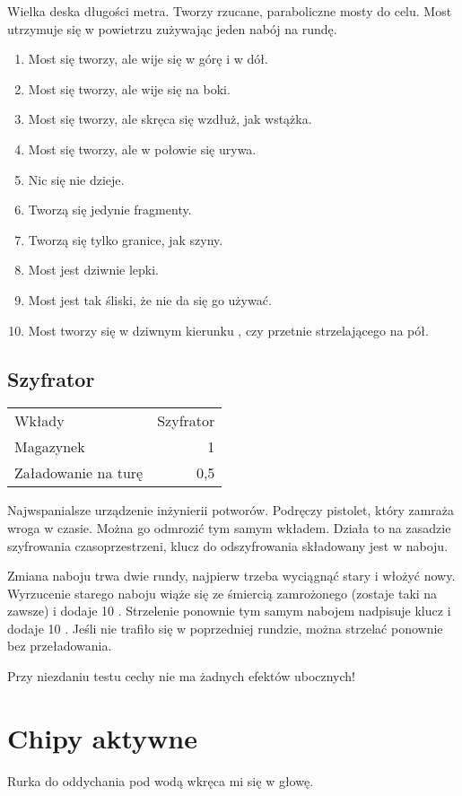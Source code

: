 Wielka deska długości metra.
Tworzy rzucane, paraboliczne mosty do celu.
Most utrzymuje się w powietrzu zużywając jeden nabój na rundę.
\begin{enumerate}
	\item Most się tworzy, ale wije się w górę i w dół.
	\item Most się tworzy, ale wije się na boki.
	\item Most się tworzy, ale skręca się wzdłuż, jak wstążka.
	\item Most się tworzy, ale w połowie się urywa.
	\item Nic się nie dzieje.
	\item Tworzą się jedynie fragmenty.
	\item Tworzą się tylko granice, jak szyny. 
	\item Most jest dziwnie lepki.
	\item Most jest tak śliski, że nie da się go używać.
	\item Most tworzy się w dziwnym kierunku \dii{}, czy przetnie strzelającego na pół.
\end{enumerate}

\subsection{Szyfrator \abt{}}

\begin{tabular}{lr}
Wkłady & Szyfrator \\
Magazynek & 1 \\
Załadowanie na turę & 0,5 \\
\end{tabular}

Najwspanialsze urządzenie inżynierii potworów.
Podręczy pistolet, który zamraża wroga w czasie.
Można go odmrozić tym samym wkładem.
Działa to na zasadzie szyfrowania czasoprzestrzeni, klucz do odszyfrowania składowany jest w naboju.

Zmiana naboju trwa dwie rundy, najpierw trzeba wyciągnąć stary i włożyć nowy.
Wyrzucenie starego naboju wiąże się ze śmiercią zamrożonego (zostaje taki na zawsze) i dodaje 10 \abgrz{}.
Strzelenie ponownie tym samym nabojem nadpisuje klucz i dodaje 10 \abgrz{}.
Jeśli nie trafiło się w poprzedniej rundzie, można strzelać ponownie bez przeładowania.

Przy niezdaniu testu cechy nie ma żadnych efektów ubocznych!

\section{Chipy aktywne}
Rurka do oddychania pod wodą wkręca mi się w głowę.

